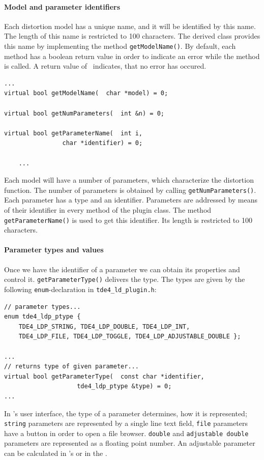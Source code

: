 \documentclass[10pt,a4paper]{article}
\begin{document}
\paragraph{Model and parameter identifiers}
Each distortion model has a unique name, and it will be identified by this name.
The length of this name is restricted to 100 characters.
The derived class provides this name by implementing the method {\tt getModelName()}.
By default, each method has a boolean return value in order to indicate an error
while the method is called. A return value of \true\ indicates, that no
error has occured.
\begin{lstlisting}[language=mycpp]
	...
virtual bool getModelName(	char *model) = 0;

virtual bool getNumParameters(	int &n) = 0;

virtual bool getParameterName(	int i,
				char *identifier) = 0;

	...
\end{lstlisting}

Each model will have a number of parameters, which characterize the distortion function.
The number of parameters is obtained by calling {\tt getNumParameters()}.
Each parameter has a type and an identifier. Parameters are addressed by means of their identifier
in every method of the plugin class. The method {\tt getParameterName()} is used to get this
identifier. Its length is restricted to 100 characters.
\paragraph{Parameter types and values}
Once we have the identifier of a parameter
we can obtain its properties and control it. {\tt getParameterType()} delivers the type.
The types are given by the following {\tt enum}-declaration in {\tt tde4\_ld\_plugin.h}:
\begin{lstlisting}[language=mycpp,tabsize=8]
// parameter types...
enum tde4_ldp_ptype {
	TDE4_LDP_STRING, TDE4_LDP_DOUBLE, TDE4_LDP_INT,
	TDE4_LDP_FILE, TDE4_LDP_TOGGLE, TDE4_LDP_ADJUSTABLE_DOUBLE };

...
// returns type of given parameter...
virtual bool getParameterType(	const char *identifier,
					tde4_ldp_ptype &type) = 0;
...
\end{lstlisting}
In \tde's user interface, the type of a parameter determines, how it is represented; {\tt string}
parameters are represented by a single line text field, {\tt file} parameters have a button
in order to open a file browser. {\tt double} and {\tt adjustable double} parameters are represented
as a floating point number. An adjustable parameter can be calculated
in \tde's  or in the .
\end{document}
